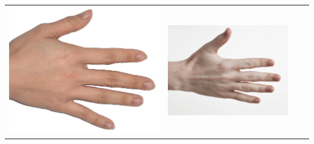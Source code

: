 \begin{longtable}{|N||c|c|c|}
\begin{minipage}{.29\textwidth}
    \includegraphics[width=\textwidth,height=\textheight,keepaspectratio]{../inputs/hand_light.jpg}
  \end{minipage} & 
  \begin{minipage}{.29\textwidth}
    \includegraphics[width=\textwidth,height=\textheight,keepaspectratio]{../inputs/hand_pale.jpg}
  \end{minipage} & 
  \begin{minipage}{.29\textwidth}

\end{minipage}
\end{longtable}
